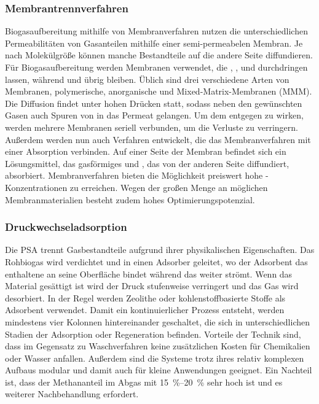 \subsubsection{Membrantrennverfahren}\label{chap:membrane} 

Biogasaufbereitung mithilfe von Membranverfahren nutzen die unterschiedlichen Permeabilitäten von Gasanteilen mithilfe einer semi-permeabelen Membran. Je nach Molekülgröße können manche Bestandteile auf die andere Seite diffundieren. Für Biogasaufbereitung werden Membranen verwendet, die , ,  und  durchdringen lassen, während  und  übrig bleiben. Üblich sind drei verschiedene Arten von Membranen, polymerische, anorganische und Mixed-Matrix-Membranen (MMM). Die Diffusion findet unter hohen Drücken statt, sodass neben den gewünschten Gasen auch Spuren von  in das Permeat gelangen. Um dem entgegen zu wirken, werden mehrere Membranen seriell verbunden, um die Verluste zu verringern. Außerdem werden nun auch Verfahren entwickelt, die das Membranverfahren mit einer Absorption verbinden. Auf einer Seite der Membran befindet sich ein Lösungsmittel, das gasförmiges  und , das von der anderen Seite diffundiert, absorbiert. Membranverfahren bieten die Möglichkeit preiswert hohe -Konzentrationen zu erreichen. Wegen der großen Menge an möglichen Membranmaterialien besteht zudem hohes Optimierungspotenzial. \parencite{KGKK2019}


\subsubsection{Druckwechseladsorption}\label{chap:PSA}

Die \gls{PSA} trennt Gasbestandteile aufgrund ihrer physikalischen Eigenschaften. Das Rohbiogas wird verdichtet und in einen Adsorber geleitet, wo der Adsorbent das enthaltene  an seine Oberfläche bindet während das  weiter strömt. Wenn das Material gesättigt ist wird der Druck stufenweise verringert und das Gas wird desorbiert. In der Regel werden Zeolithe oder kohlenstoffbasierte Stoffe als Adsorbent verwendet. Damit ein kontinuierlicher Prozess entsteht, werden mindestens vier Kolonnen hintereinander geschaltet, die sich in unterschiedlichen Stadien der Adsorption oder Regeneration befinden. Vorteile der Technik sind, dass im Gegensatz zu Waschverfahren keine zusätzlichen Kosten für Chemikalien oder Wasser anfallen. Außerdem sind die Systeme trotz ihres relativ komplexen Aufbaus modular und damit auch für kleine Anwendungen geeignet. Ein Nachteil ist, dass der Methananteil im Abgas mit \SIrange{15}{20}{\percent} sehr hoch ist und es weiterer Nachbehandlung erfordert. \parencite{BHPT13} \parencite{KGKK2019} 



